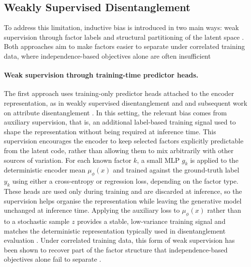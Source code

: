 \subsection{Weakly Supervised Disentanglement}
To address this limitation, inductive bias is introduced in two main ways: weak supervision through factor labels \citep{weakly_supervised_disentanglement, on_disentangled_representation_learning} and structural partitioning of the latent space \citep{louiset2024sepvae}. 
Both approaches aim to make factors easier to separate under correlated training data, where independence-based objectives alone are often insufficient

\paragraph{Weak supervision through training-time predictor heads.}
The first approach uses training-only predictor heads attached to the encoder representation, as in weakly supervised disentanglement \citep{weakly_supervised_disentanglement} and and subsequent work on attribute disentanglement \citep{attribute_disentanglement}.
In this setting, the relevant bias comes from auxiliary supervision, that is,
an additional label-based training signal used to shape the representation without being required at inference time. 
This supervision encourages the encoder to keep selected
factors explicitly predictable from the latent code, rather than allowing them to mix
arbitrarily with other sources of variation.
For each known factor $k$, a small MLP $g_k$ is applied
to the deterministic encoder mean $\mu_\phi(x)$ and trained against the ground-truth label
$y_k$ using either a cross-entropy or regression loss, depending on the factor type. These
heads are used only during training and are discarded at inference, so the supervision helps organise the representation while leaving the generative model unchanged at inference time. 
Applying the auxiliary loss to $\mu_\phi(x)$ rather than to a stochastic sample $z$ provides a stable,
low-variance training signal and matches the deterministic representation typically used in
disentanglement evaluation \citep{eastwood2018framework, challeau2019challenging}. Under
correlated training data, this form of weak supervision has been shown to recover part of
the factor structure that independence-based objectives alone fail to separate
\citep{traeuble2021disentangled}.

